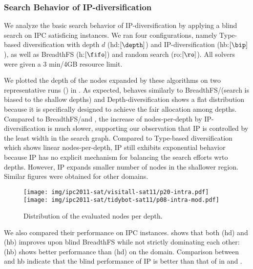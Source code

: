 \subsubsection{Search Behavior of IP-diversification}

We analyze the basic search behavior of IP-diversification by applying a blind search on IPC satisficing instances.
We ran four configurations, namely Type-based diversification with depth $d$ (hd:$[\depth]$) and IP-diversification (hb:$[\bip]$), as well as BreadthFS (h:$[\fifo]$) and random search (ro:$[\ro]$).
All solvers were given a 3 min/4GB resource limit.

We plotted the depth of the nodes expanded by these algorithms on two representative runs () in .
As expected, \ro behaves similarly to BreadthFS/\fifo (search is biased to the shallow depths) and
Depth-diversification shows a flat distribution because it is specifically designed to achieve the fair allocation among depths.
Compared to BreadthFS/\fifo and \ro, the increase of nodes-per-depth by IP-diversification is much slower, supporting our observation that IP is controlled by the least width in the search graph.
Compared to Type-based diversification which shows linear nodes-per-depth, IP still exhibits exponential behavior because IP has no explicit mechanism for balancing  the search  efforts wrto depths. However, IP expands smaller number of nodes in the shallower region.
Similar figures were obtained for other domains.

\begin{figure}
 \texttt{[image: img/ipc2011-sat/visitall-sat11/p20-intra.pdf]}
 \texttt{[image: img/ipc2011-sat/tidybot-sat11/p08-intra-mod.pdf]}
 \caption{Distribution of the evaluated nodes per depth.}
 \label{fig:distribution}
\end{figure}

We also compared their performance on IPC instances.
 shows that both (hd) and (hb) improves upon blind BreadthFS while 
not strictly dominating each other: (hb) shows better performance than
(hd) on the  domain.
Comparison between \ro and hb indicate that the blind performance of IP is better than that of \ro in  and .

